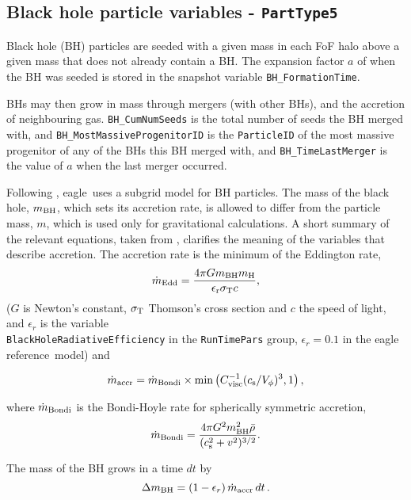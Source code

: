 \documentclass[10pt, a4paper]{article}
\newcommand{\eagle}{{\sc eagle}}
\newcommand{\REF}{{\sc eagle reference}}
\begin{document}
\subsection{Black hole particle variables - \texttt{PartType5}}
\label{SecBH}
Black hole (BH) particles are seeded with a given mass in each FoF halo above a
given mass that does not already contain a BH. The expansion factor $a$ of when
the BH was seeded is stored in the snapshot variable
\texttt{BH\_FormationTime}.

BHs may then grow in mass through mergers (with other BHs), and the accretion
of neighbouring gas.  \texttt{BH\_CumNumSeeds} is the total number of seeds the
BH merged with, and \texttt{BH\_MostMassiveProgenitorID} is the
\texttt{ParticleID} of the most massive progenitor of any of the BHs this BH
merged with, and \texttt{BH\_TimeLastMerger} is the value of $a$ when the last
merger occurred.

Following \cite{2005MNRAS.361..776S}, \eagle\ uses a subgrid model for BH particles.
The mass of the black hole, $m_{\rm BH}$, which sets its accretion rate, is
allowed to differ from the particle mass, $m$, which is used only for
gravitational calculations. A short summary of the relevant equations, taken
from \cite{2015MNRAS.446..521S}, clarifies the meaning of the variables that describe
accretion. The accretion rate is the minimum of the Eddington rate,
\begin{equation} \dot{m}_{\rm Edd} = \frac{4\pi G m_{\rm BH} m_{\rm
H}}{\epsilon_{\rm r} \sigma_{\rm T} c}, \end{equation} ($G$ is Newton's
constant, $\sigma_{\rm T}$ Thomson's cross section and $c$ the speed of light,
and $\epsilon_r$ is the variable \\ \texttt{BlackHoleRadiativeEfficiency} in
the \texttt{RunTimePars} group, $\epsilon_r=0.1$ in the \REF\ model)
and

\begin{equation}
\dot{m}_{\rm accr} = \dot{m}_{\rm Bondi} \times \min\left
(C_{\rm visc}^{-1}(c_{\rm s}/V_\phi)^3,1 \right ),
\label{EqMdotAccr}
\end{equation}

\noindent where $\dot{m}_{\rm Bondi}$ is the Bondi-Hoyle rate for
spherically symmetric accretion, \begin{equation} \dot{m}_{\rm Bondi} =
\frac{4\pi G^2 m_{\rm BH}^2 \bar{\rho}}{(c_{\rm s}^2 + v^2)^{3/2}}.
\end{equation}

\noindent The mass of the BH grows in a time $dt$ by \begin{equation} \Delta
m_{\rm BH} = (1-\epsilon_r)\,\dot m_{\rm accr}\,dt\,. \end{equation} \noindent
\end{document}
